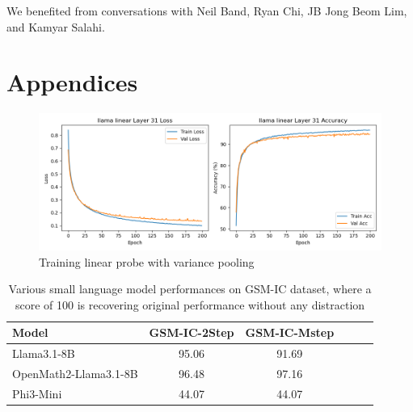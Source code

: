 \documentclass{article}
\begin{document}
We benefited from conversations with Neil Band, Ryan Chi, JB Jong Beom Lim, and Kamyar Salahi.




\section{Appendices} 

\begin{figure}[h!]
    \centering
    \includegraphics[width=\linewidth]{tex/finalreport230/llama_variance_pooling_training_plot.png}
    \caption{Training linear probe with variance pooling}
    \label{fig:variance_pooling_training}
\end{figure}

\begin{table}[hbp]
    \centering
    \begin{tabular}{l c c c c c}
        \toprule
        \textbf{Model} & \textbf{GSM-IC-2Step} & \textbf{GSM-IC-Mstep}  \\
        \midrule
        Llama3.1-8B & 95.06 & 91.69   \\
        OpenMath2-Llama3.1-8B & 96.48 & 97.16   \\
        Phi3-Mini & 44.07 & 44.07 \\
        \bottomrule
    \end{tabular}
    \caption{Various small language model performances on GSM-IC dataset, where a score of 100 is recovering original performance without any distraction}
    \label{tab:gsm_ic_metrics}
\end{table}
\end{document}

